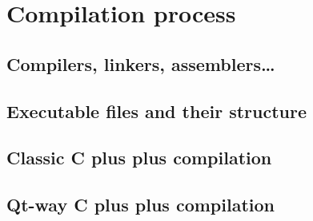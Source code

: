 \section{Compilation process}\label{section:compilation}

\subsection{Compilers, linkers, assemblers\ldots}

\subsection{Executable files and their structure}

\subsection{Classic C plus plus compilation}

\subsection{Qt-way C plus plus compilation}
